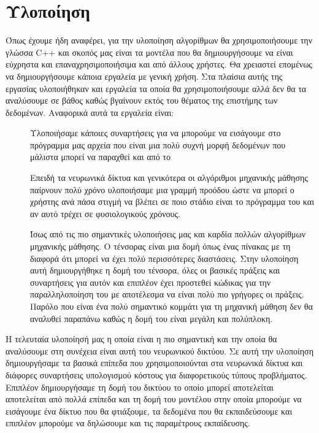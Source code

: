 \newpage
\section{Υλοποίηση}
Όπως έχουμε ήδη αναφέρει, για την υλοποίηση αλγορίθμων θα χρησιμοποιήσουμε την γλώσσα \textlatin{C++} και σκοπός μας είναι τα μοντέλα που θα δημιουργήσουμε να είναι εύχρηστα και επαναχρησιμοποιήσιμα και από
άλλους χρήστες. Θα χρειαστεί επομένως να δημιουργήσουμε κάποια εργαλεία με γενική χρήση. Στα πλαίσια αυτής της εργασίας υλοποιήθηκαν και εργαλεία τα οποία θα χρησιμοποιήσουμε αλλά δεν θα τα αναλύσουμε σε βάθος καθώς βγαίνουν εκτός του
θέματος της επιστήμης των δεδομένων. Αναφορικά αυτά τα εργαλεία είναι:
\begin{description}
    \item[] Υλοποιήσαμε κάποιες συναρτήσεις για να μπορούμε να εισάγουμε στο πρόγραμμα μας αρχεία  που είναι μια πολύ συχνή μορφή δεδομένων που μάλιστα μπορεί να παραχθεί και από το 
    \item[] Επειδή τα νευρωνικά δίκτυα και γενικότερα οι αλγόριθμοι μηχανικής μάθησης παίρνουν πολύ χρόνο υλοποιήσαμε μια γραμμή προόδου ώστε να μπορεί ο χρήστης ανά πάσα στιγμή να βλέπει σε ποιο στάδιο είναι το πρόγραμμα
    του και αν αυτό τρέχει σε φυσιολογικούς χρόνους.
    \item[] Ίσως από τις πιο σημαντικές υλοποιήσεις μας και καρδία πολλών αλγορίθμων μηχανικής μάθησης. Ο τένσορας είναι μια δομή όπως ένας πίνακας με τη διαφορά ότι μπορεί να έχει πολύ περισσότερες διαστάσεις. Στην υλοποίηση αυτή δημιουργήθηκε η δομή του τένσορα, όλες οι βασικές πράξεις και συναρτήσεις για αυτόν και επιπλέον έχει προστεθεί κώδικας για την παραλληλοποίηση του με αποτέλεσμα να είναι πολύ πιο γρήγορες οι πράξεις. Παρόλο που είναι ένα πολύ
    σημαντικό κομμάτι για τη μηχανική μάθηση δεν θα αναλυθεί παραπάνω καθώς η δομή του είναι μεγάλη και πολύπλοκη.
\end{description}

Η τελευταία υλοποίησή μας η οποία είναι η πιο σημαντική και την οποία θα αναλύσουμε στη συνέχεια είναι αυτή του νευρωνικού δικτύου. Σε αυτή την υλοποίηση δημιουργήσαμε τα βασικά επίπεδα που χρησιμοποιούνται στα νευρωνικά δίκτυα και διάφορες
συναρτήσεις υπολογισμού κόστους για διαφορετικούς τύπους προβλήματος. Επιπλέον δημιουργήσαμε τη δομή του δικτύου το οποίο μπορεί αποτελείται αποτελείται από πολλά επίπεδα και τη δομή του μοντέλου στην οποία μπορούμε να εισάγουμε ένα δίκτυο που θα φτιάξουμε, τα δεδομένα που θα εκπαιδεύσουμε και επιπλέον μπορούμε να δηλώσουμε και τις παραμέτρους εκπαίδευσης.

